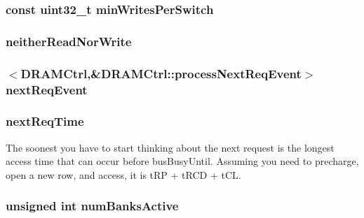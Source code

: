 \label{classDRAMCtrl_accaed2ab83bb63d6ddff7bfa861ea537}
\hypertarget{classDRAMCtrl_a2753a60747e9836fe5f5fec7b613385c}{
\subsubsection[{minWritesPerSwitch}]{\setlength{\rightskip}{0pt plus 5cm}const {\bf uint32\_\-t} {\bf minWritesPerSwitch}}}
\label{classDRAMCtrl_a2753a60747e9836fe5f5fec7b613385c}
\hypertarget{classDRAMCtrl_a10a3647b9ff175594214578eece1e1f7}{
\subsubsection[{neitherReadNorWrite}]{ {\bf neitherReadNorWrite}}}
\label{classDRAMCtrl_a10a3647b9ff175594214578eece1e1f7}
\hypertarget{classDRAMCtrl_a6f6c894e157329404d6b23503c4fa62e}{
\subsubsection[{nextReqEvent}]{$<${\bf DRAMCtrl},\&DRAMCtrl::processNextReqEvent$>$ {\bf nextReqEvent}}}
\label{classDRAMCtrl_a6f6c894e157329404d6b23503c4fa62e}
\hypertarget{classDRAMCtrl_a61a2436b0d2ca4872e69f76fecaeca7f}{
\subsubsection[{nextReqTime}]{ {\bf nextReqTime}}}
\label{classDRAMCtrl_a61a2436b0d2ca4872e69f76fecaeca7f}
The soonest you have to start thinking about the next request is the longest access time that can occur before busBusyUntil. Assuming you need to precharge, open a new row, and access, it is tRP + tRCD + tCL. \hypertarget{classDRAMCtrl_a2742d81312b2f4e257aaa3690989bc88}{
\subsubsection[{numBanksActive}]{\setlength{\rightskip}{0pt plus 5cm}unsigned int {\bf numBanksActive}}}
